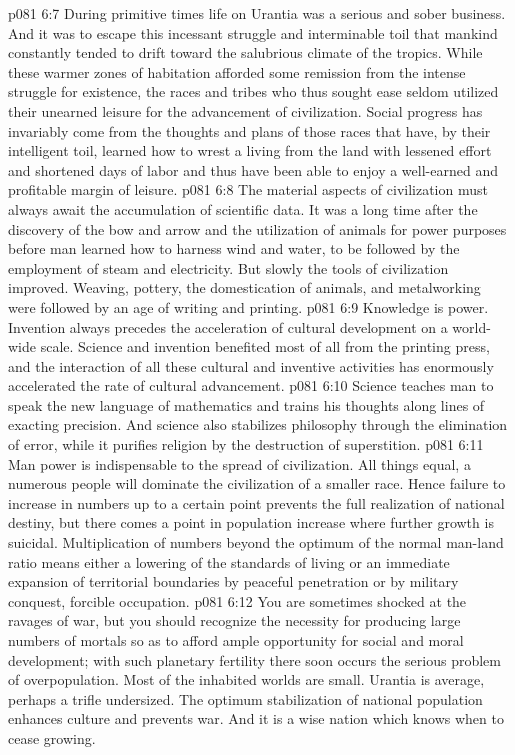 \vs p081 6:7 During primitive times life on Urantia was a serious and sober business. And it was to escape this incessant struggle and interminable toil that mankind constantly tended to drift toward the salubrious climate of the tropics. While these warmer zones of habitation afforded some remission from the intense struggle for existence, the races and tribes who thus sought ease seldom utilized their unearned leisure for the advancement of civilization. Social progress has invariably come from the thoughts and plans of those races that have, by their intelligent toil, learned how to wrest a living from the land with lessened effort and shortened days of labor and thus have been able to enjoy a well\hyp{}earned and profitable margin of leisure.
\pc \vs p081 6:8 \bibnobreakspace {} The material aspects of civilization must always await the accumulation of scientific data. It was a long time after the discovery of the bow and arrow and the utilization of animals for power purposes before man learned how to harness wind and water, to be followed by the employment of steam and electricity. But slowly the tools of civilization improved. Weaving, pottery, the domestication of animals, and metalworking were followed by an age of writing and printing.
\vs p081 6:9 Knowledge is power. Invention always precedes the acceleration of cultural development on a world\hyp{}wide scale. Science and invention benefited most of all from the printing press, and the interaction of all these cultural and inventive activities has enormously accelerated the rate of cultural advancement.
\vs p081 6:10 Science teaches man to speak the new language of mathematics and trains his thoughts along lines of exacting precision. And science also stabilizes philosophy through the elimination of error, while it purifies religion by the destruction of superstition.
\pc \vs p081 6:11 \bibnobreakspace {} Man power is indispensable to the spread of civilization. All things equal, a numerous people will dominate the civilization of a smaller race. Hence failure to increase in numbers up to a certain point prevents the full realization of national destiny, but there comes a point in population increase where further growth is suicidal. Multiplication of numbers beyond the optimum of the normal man\hyp{}land ratio means either a lowering of the standards of living or an immediate expansion of territorial boundaries by peaceful penetration or by military conquest, forcible occupation.
\vs p081 6:12 You are sometimes shocked at the ravages of war, but you should recognize the necessity for producing large numbers of mortals so as to afford ample opportunity for social and moral development; with such planetary fertility there soon occurs the serious problem of overpopulation. Most of the inhabited worlds are small. Urantia is average, perhaps a trifle undersized. The optimum stabilization of national population enhances culture and prevents war. And it is a wise nation which knows when to cease growing.
